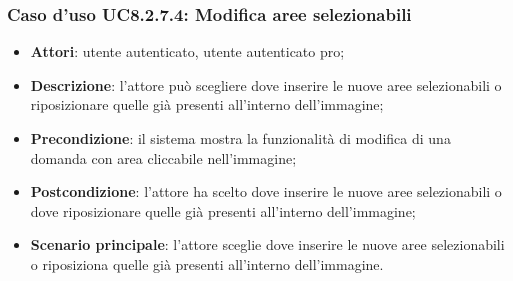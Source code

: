 \subsubsection{Caso d'uso UC8.2.7.4: Modifica aree selezionabili}
\begin{itemize}
	\item \textbf{Attori}: utente autenticato, utente autenticato pro;
	\item \textbf{Descrizione}: l'attore può scegliere dove inserire le nuove aree selezionabili o riposizionare quelle già presenti all'interno dell'immagine;
	\item \textbf{Precondizione}: il sistema mostra la funzionalità di modifica di una domanda con area cliccabile nell'immagine; 
	
	\item \textbf{Postcondizione}: l'attore ha scelto dove inserire le nuove aree selezionabili o dove riposizionare quelle già presenti all'interno dell'immagine;
	\item \textbf{Scenario principale}: l'attore sceglie dove inserire le nuove aree selezionabili o riposiziona quelle già presenti all'interno dell'immagine. 	
\end{itemize}
